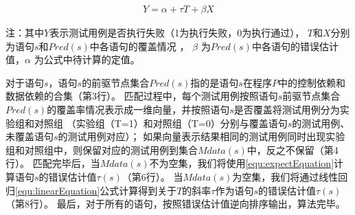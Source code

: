 \begin{equation}
\begin{aligned}
Y =\alpha +\tau T+\beta X 
\end{aligned}
\label{equ:linearEquation} 
\end{equation}
\begin{scriptsize}
	注：其中$Y$表示测试用例是否执行失败（1为执行失败，0为执行通过），
	$T$和$X$分别为语句$s$和$Pred(s)$中各语句的覆盖情况 ，
	$\beta$ 为$Pred(s)$中各语句的错误估计值，$\alpha$ 为公式中待计算的定值。
\end{scriptsize}



对于语句$s$，语句$s$的前驱节点集合$Pred(s)$指的是语句$s$在程序$P$中的控制依赖和数据依赖的合集（第3行）。
匹配过程中，每个测试用例按照语句$s$前驱节点集合$Pred(s)$的覆盖率情况表示成一维向量，并按照语句$s$是否覆盖将测试用例分为实验组和对照组
（实验组（T=1）和对照组（T=0）分别与覆盖语句$s$的测试用例、未覆盖语句$s$的测试用例对应）；
如果向量表示结果相同的测试用例同时出现实验组和对照组中，则保留对应的测试用例到集合$Mdata(s)$中，反之不保留（第4行）。
匹配完毕后，当$Mdata(s)$不为空集，我们将使用\autoref{equ:expectEquation}计算语句$s$的错误估计值$\tau(s)$（第6行）。
当$Mdata(s)$为空集，我们将通过线性回归\autoref{equ:linearEquation}公式计算得到关于$T$的斜率$\tau$作为语句$s$的错误估计值$\tau(s)$（第8行）。
最后，对于所有的语句，按照错误估计值逆向排序输出，算法完毕。




